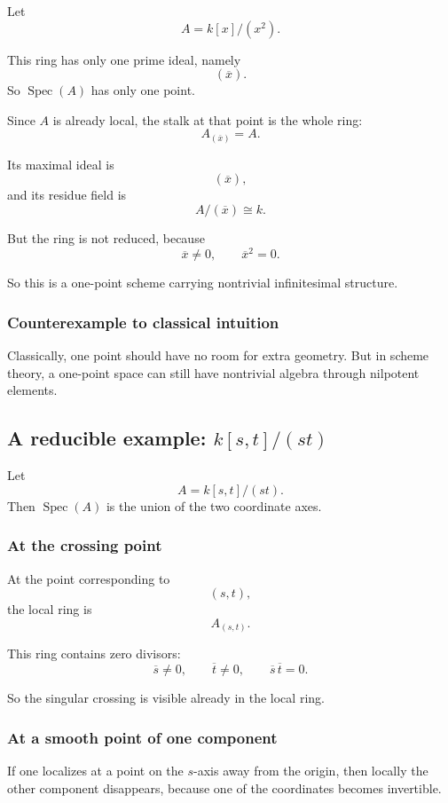 \documentclass[12pt,a4paper]{article}
\theoremstyle{notespace}
\newcommand{\Spec}{\operatorname{Spec}}
\theoremstyle{definition}
\begin{document}
Let
\[
A=k[x]/(x^2).
\]

This ring has only one prime ideal, namely
\[
(\overline{x}).
\]
So \(\Spec(A)\) has only one point.

Since \(A\) is already local, the stalk at that point is the whole ring:
\[
A_{(\overline{x})}=A.
\]

Its maximal ideal is
\[
(\overline{x}),
\]
and its residue field is
\[
A/(\overline{x})\cong k.
\]

But the ring is not reduced, because
\[
\overline{x}\neq 0,
\qquad
\overline{x}^2=0.
\]

So this is a one-point scheme carrying nontrivial infinitesimal structure.

\subsubsection{Counterexample to classical intuition}

Classically, one point should have no room for extra geometry.  
But in scheme theory, a one-point space can still have nontrivial algebra through nilpotent elements.

\subsection{A reducible example: \(k[s,t]/(st)\)}

Let
\[
A=k[s,t]/(st).
\]
Then \(\Spec(A)\) is the union of the two coordinate axes.

\subsubsection{At the crossing point}

At the point corresponding to
\[
(s,t),
\]
the local ring is
\[
A_{(s,t)}.
\]

This ring contains zero divisors:
\[
\overline{s}\neq 0,\qquad \overline{t}\neq 0,\qquad \overline{s}\,\overline{t}=0.
\]

So the singular crossing is visible already in the local ring.

\subsubsection{At a smooth point of one component}

If one localizes at a point on the \(s\)-axis away from the origin, then locally the other component disappears, because one of the coordinates becomes invertible.
\end{document}
